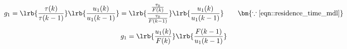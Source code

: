 \begin{align*}
        g_1 &= \lrb{\frac{\tau(k)}{\tau(k-1)}}
                                \lrb{\frac{u_1(k)}{u_1(k-1)}}
                = \lrb{\frac{\frac{\tau_0}{F(k)}}{\frac{\tau_0}{F(k-1)}}} \lrb{\frac{u_1(k)}{u_1(k-1)}}
                \qquad \bm{\because \ref{eqn::residence_time_mdl}}
\end{align*}
\begin{align}
        g_1 &= \lrb{\frac{u_1(k)}{F(k)}} \lrb{\frac{F(k-1)}{u_1(k-1)}}
\end{align}
